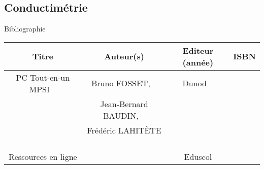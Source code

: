 \begin{headerBlock}
\chapter{Conductimétrie}
\label{LC_Conductimétrie}
 \end{headerBlock}



\begin{reportBlock}{Bibliographie}

\begin{center}
\begin{tabular}{|c|c|c|c|}\hline
Titre & Auteur(s) & Editeur (année) & ISBN \\ \hline
PC Tout-en-un MPSI ~ & Bruno FOSSET,  ~ & Dunod  ~ & ~ \\
~ & Jean-Bernard BAUDIN, ~ &  ~ & ~ \\
~ & Frédéric LAHITÈTE  ~ &  ~ & ~ \\ \hline
Ressources en ligne & ~ & Eduscol & ~ \\ \hline
\end{tabular}
\end{center}

\end{reportBlock}

